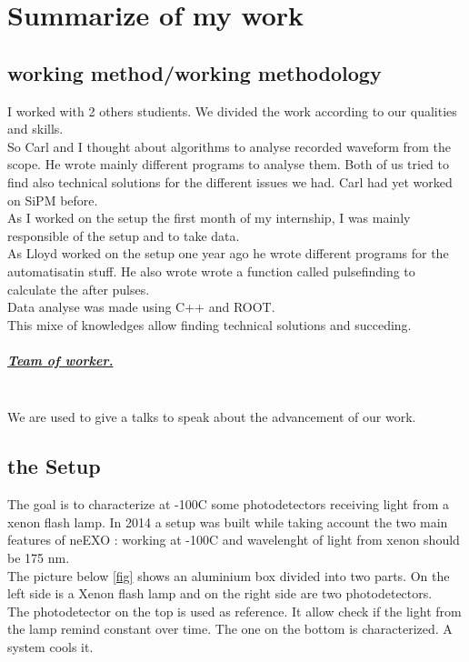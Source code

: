 \chapter{Summarize of my work}
  
  \section{working method/working methodology}
  
  I worked with 2 others studients.  We divided the work according to our qualities and skills.
  \\
  
  So Carl and I thought about algorithms to analyse recorded waveform from the scope. He wrote mainly different programs to analyse them.
  Both of us tried to find also technical solutions for the different issues we had. Carl had yet worked on SiPM before. \\
  As I worked on the setup the first month of my internship, I was mainly responsible of the setup and to take data.\\
  As Lloyd worked on the setup one year ago he wrote different programs for the automatisatin stuff. He also wrote wrote a function called 
  pulsefinding to calculate the after pulses.\\
  Data analyse was made using C++ and ROOT. 
  \\
  
  This mixe of knowledges allow finding technical solutions and succeding.  
  
  \paragraph{\underline{\emph{Team of worker.}}}\hspace{0.5cm}\\
  
  We are used to give a talks to speak about the advancement of our work. 
  
  \section{the Setup}
  
  The goal is to characterize at -100C some photodetectors receiving light from a xenon flash lamp. In 2014 a setup was built while taking 
  account the two main features of neEXO : working at -100C and wavelenght of light from xenon should be 175 nm.\\ 
  The picture below \ref{fig} shows an aluminium box divided into two parts. On the left side is a Xenon flash lamp and on the right side 
  are two photodetectors. \\
  The photodetector on the top is used as reference. It allow check if the light from the lamp remind constant over time. 
  The one on the bottom is characterized. A system cools it.     
  
